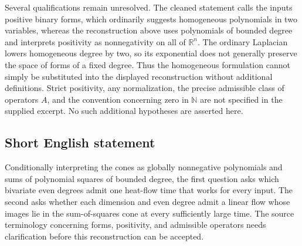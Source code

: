 \documentclass[11pt]{article}
\newcommand{\N}{\mathbb{N}}
\newcommand{\R}{\mathbb{R}}
\begin{document}
Several qualifications remain unresolved. The cleaned statement calls the inputs positive binary forms, which ordinarily suggests homogeneous polynomials in two variables, whereas the reconstruction above uses polynomials of bounded degree and interprets positivity as nonnegativity on all of \(\R^n\). The ordinary Laplacian lowers homogeneous degree by two, so its exponential does not generally preserve the space of forms of a fixed degree. Thus the homogeneous formulation cannot simply be substituted into the displayed reconstruction without additional definitions. Strict positivity, any normalization, the precise admissible class of operators \(A\), and the convention concerning zero in \(\N\) are not specified in the supplied excerpt. No such additional hypotheses are asserted here.
\subsection{Short English statement}
Conditionally interpreting the cones as globally nonnegative polynomials and sums of polynomial squares of bounded degree, the first question asks which bivariate even degrees admit one heat-flow time that works for every input. The second asks whether each dimension and even degree admit a linear flow whose images lie in the sum-of-squares cone at every sufficiently large time. The source terminology concerning forms, positivity, and admissible operators needs clarification before this reconstruction can be accepted.
\end{document}
